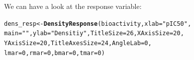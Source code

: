 \documentclass[twoside,a4wide,12pt]{article}\usepackage[]{graphicx}\usepackage[]{color}
\makeatletter
\newcommand{\hlnum}[1]{\textcolor[rgb]{0.686,0.059,0.569}{#1}}%
\newcommand{\hlstr}[1]{\textcolor[rgb]{0.192,0.494,0.8}{#1}}%
\newcommand{\hlstd}[1]{\textcolor[rgb]{0.345,0.345,0.345}{#1}}%
\newcommand{\hlkwb}[1]{\textcolor[rgb]{0.69,0.353,0.396}{#1}}%
\newcommand{\hlkwc}[1]{\textcolor[rgb]{0.333,0.667,0.333}{#1}}%
\newcommand{\hlkwd}[1]{\textcolor[rgb]{0.737,0.353,0.396}{\textbf{#1}}}%
\newenvironment{kframe}{%
 \def\at@end@of@kframe{}%
 \ifinner\ifhmode%
  \def\at@end@of@kframe{\end{minipage}}%
  \begin{minipage}{\columnwidth}%
 \fi\fi%
 \def\FrameCommand##1{\hskip\@totalleftmargin \hskip-\fboxsep
 \colorbox{shadecolor}{##1}\hskip-\fboxsep
     \hskip-\linewidth \hskip-\@totalleftmargin \hskip\columnwidth}%
 \MakeFramed {\advance\hsize-\width
   \@totalleftmargin\z@ \linewidth\hsize
   \@setminipage}}%
 {\par\unskip\endMakeFramed%
 \at@end@of@kframe}
\newenvironment{knitrout}{}{} %
\makeatother
\begin{document}
We can have a look at the response variable:
\begin{knitrout}
\color{fgcolor}\begin{kframe}
\begin{alltt}
\hlstd{dens_resp} \hlkwb{<-} \hlkwd{DensityResponse}\hlstd{(bioactivity,} \hlkwc{xlab} \hlstd{=} \hlstr{"pIC50"}\hlstd{,}
    \hlkwc{main} \hlstd{=} \hlstr{""}\hlstd{,} \hlkwc{ylab} \hlstd{=} \hlstr{"Densitiy"}\hlstd{,} \hlkwc{TitleSize} \hlstd{=} \hlnum{26}\hlstd{,} \hlkwc{XAxisSize} \hlstd{=} \hlnum{20}\hlstd{,}
    \hlkwc{YAxisSize} \hlstd{=} \hlnum{20}\hlstd{,} \hlkwc{TitleAxesSize} \hlstd{=} \hlnum{24}\hlstd{,} \hlkwc{AngleLab} \hlstd{=} \hlnum{0}\hlstd{,}
    \hlkwc{lmar} \hlstd{=} \hlnum{0}\hlstd{,} \hlkwc{rmar} \hlstd{=} \hlnum{0}\hlstd{,} \hlkwc{bmar} \hlstd{=} \hlnum{0}\hlstd{,} \hlkwc{tmar} \hlstd{=} \hlnum{0}\hlstd{)}
\end{alltt}
\end{kframe}
\end{knitrout}
\end{document}
